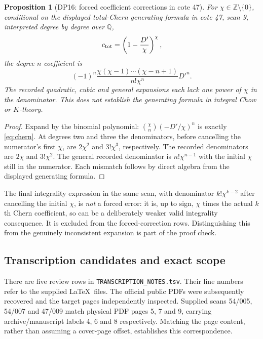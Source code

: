 \documentclass[11pt,a4paper]{article}
\newtheorem{proposition}[theorem]{Proposition}
\theoremstyle{definition}\newtheorem{remark}[theorem]{Remark}
\newcommand{\Z}{\mathbb Z}\newcommand{\Q}{\mathbb Q}\newcommand{\F}{\mathbb F}
\begin{document}
\begin{proposition}[DP16: forced coefficient corrections in cote 47]\label{DP16}
For $\chi\in\Z\setminus\{0\}$, conditional on the displayed total-Chern generating formula in cote 47, scan 9, interpreted degree by degree over $\Q$,
\[
 c_{\rm tot}=\left(1-\frac{D'}\chi\right)^\chi,
\]
the degree-$n$ coefficient is
\begin{equation}\label{eq:chern}
 (-1)^n\frac{\chi(\chi-1)\cdots(\chi-n+1)}{n!\chi^n}D'^n.
\end{equation}
The recorded quadratic, cubic and general expansions each lack one power of $\chi$ in the denominator. This does not establish the generating formula in integral Chow or $K$-theory.
\end{proposition}
\begin{proof}
Expand by the binomial polynomial: $\binom\chi n(-D'/\chi)^n$ is exactly \eqref{eq:chern}. At degrees two and three the denominators, before cancelling the numerator's first $\chi$, are $2\chi^2$ and $3!\chi^3$, respectively. The recorded denominators are $2\chi$ and $3!\chi^2$. The general recorded denominator is $n!\chi^{n-1}$ with the initial $\chi$ still in the numerator. Each mismatch follows by direct algebra from the displayed generating formula.
\end{proof}

The final integrality expression in the same scan, with denominator $k!\chi^{k-2}$ after cancelling the initial $\chi$, is \emph{not} a forced error: it is, up to sign, $\chi$ times the actual $k$th Chern coefficient, so can be a deliberately weaker valid integrality consequence. It is excluded from the forced-correction rows. Distinguishing this from the genuinely inconsistent expansion is part of the proof check.

\subsection{Transcription candidates and exact scope}

There are five review rows in \texttt{TRANSCRIPTION\_NOTES.tsv}. Their line numbers refer to the supplied \LaTeX\ files. The official public PDFs \cite{PublicArchive} were subsequently recovered and the target pages independently inspected. Supplied scans 54/005, 54/007 and 47/009 match physical PDF pages 5, 7 and 9, carrying archive/manuscript labels 4, 6 and 8 respectively. Matching the page content, rather than assuming a cover-page offset, establishes this correspondence.
\end{document}
